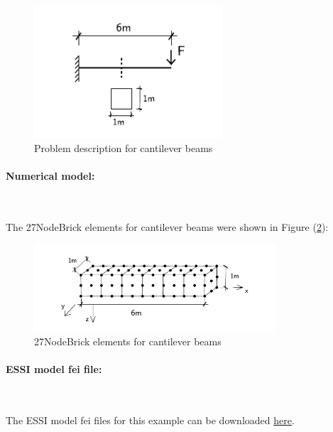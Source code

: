 \documentclass[fleqn,11pt]{article}
\begin{document}
\begin{figure}[H]
  \centering
  \includegraphics[width=7cm]{../Figure-files/cantilever_6.pdf}
  \caption{Problem description for cantilever beams}
  \label{fig Problem description for cantilever beams of different Poisson's 27}
\end{figure}

\paragraph{Numerical model:} ~

The 27NodeBrick elements for cantilever beams were shown in Figure (\ref{fig 27NodeBrick elements for cantilever beams of different Poisson's ratios}):
\begin{figure}[H]
  \centering
  \includegraphics[width=9cm]{../Figure-files/beam_27brick_6div.pdf}
  \caption{27NodeBrick elements for cantilever beams}
  \label{fig 27NodeBrick elements for cantilever beams of different Poisson's ratios}
\end{figure}

\paragraph{ESSI model fei file: } ~




The ESSI model fei files for this example can be downloaded \href{https://github.com/BorisJeremic/Real-ESSI-Examples/blob/master/model_fei_file/27NodeBrick_cantilever_different_Poisson/27NodeBrick_cantilever_different_Poisson.tgz?raw=true}{here}.
\end{document}
